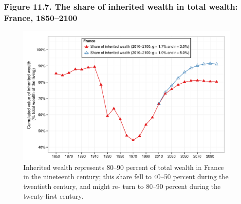\documentclass[t]{beamer}\usepackage[]{graphicx}\usepackage[]{color}
\newenvironment{knitrout}{}{} %
\begin{document}
\begin{frame}[label=Figure_11_7]
\frametitle{Figure 11.7. The share of inherited wealth in total wealth: France, 1850--2100}
\begin{figure}[t]
\begin{minipage}[b]{\textwidth}
\centering
\begin{knitrout}\footnotesize
{}\color{fgcolor}

{\centering \includegraphics[width=1\linewidth]{figures/color/Figure_11_7} 

}



\end{knitrout}
\caption{Inherited wealth represents 80--90 percent of total wealth in France in the nineteenth century; this share fell to 40--50 percent during the twentieth century, and might re- turn to 80--90 percent during the twenty-first century.}
\end{minipage}
\end{figure}
\end{frame}
\end{document}
